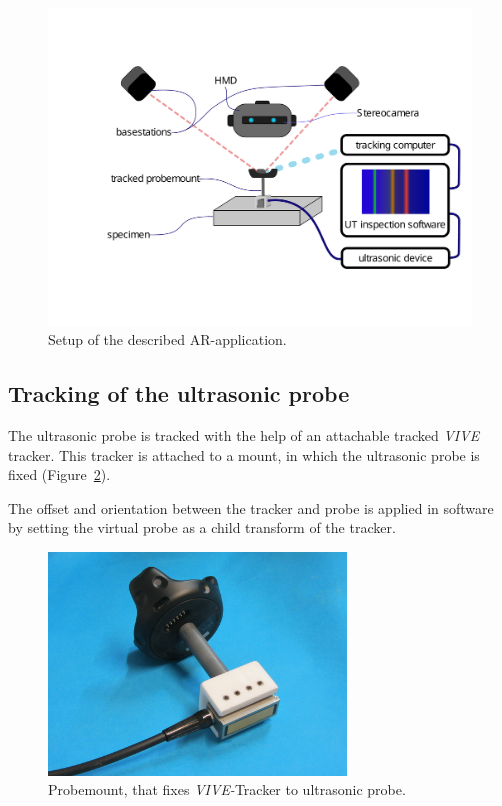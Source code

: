 \documentclass{VRARWorkshop}
\begin{document}
\begin{figure}[h!]
    \begin{center}
        \includegraphics[width=158mm]{images/Setup-ARUS}
        \caption{\label{fig:Setup} Setup of the described AR-application.}
    \end{center}
\end{figure}

\subsection{Tracking of the ultrasonic probe}
The ultrasonic probe is tracked with the help of an attachable tracked \textit{VIVE} tracker.
This tracker is attached to a mount, in which the ultrasonic probe is fixed (Figure~\ref{fig:probemount}).

The offset and orientation between the tracker and probe is applied in software by setting the virtual probe as a child transform of the tracker.

\begin{figure}[h!]
  \label{fig:probemount}
    \begin{center}
        \includegraphics[width=79mm]{images/probemount}
        \caption{\label{fig:probemount} Probemount, that fixes \textit{VIVE-}Tracker to ultrasonic probe.}
    \end{center}
\end{figure}
\end{document}

